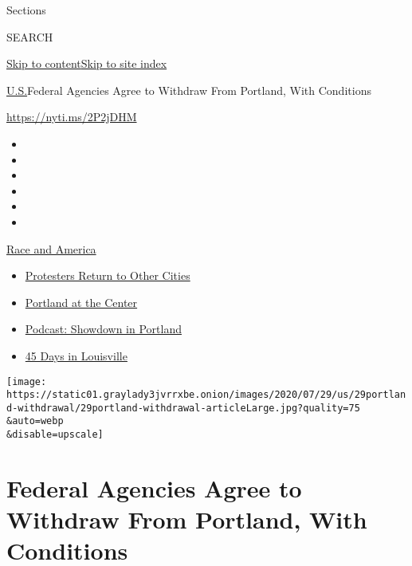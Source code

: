 Sections

SEARCH

\protect\hyperlink{site-content}{Skip to
content}\protect\hyperlink{site-index}{Skip to site index}

\href{/section/us}{U.S.}\textbar{}Federal Agencies Agree to Withdraw
From Portland, With Conditions

\url{https://nyti.ms/2P2jDHM}

\begin{itemize}
\item
\item
\item
\item
\item
\item
\end{itemize}

\href{https://www.nytimes3xbfgragh.onion/news-event/george-floyd-protests-minneapolis-new-york-los-angeles?action=click\&pgtype=Article\&state=default\&region=TOP_BANNER\&context=storylines_menu}{Race
and America}

\begin{itemize}
\tightlist
\item
  \href{https://www.nytimes3xbfgragh.onion/2020/07/26/us/protests-portland-seattle-trump.html?action=click\&pgtype=Article\&state=default\&region=TOP_BANNER\&context=storylines_menu}{Protesters
  Return to Other Cities}
\item
  \href{https://www.nytimes3xbfgragh.onion/2020/07/24/us/portland-oregon-protests-white-race.html?action=click\&pgtype=Article\&state=default\&region=TOP_BANNER\&context=storylines_menu}{Portland
  at the Center}
\item
  \href{https://www.nytimes3xbfgragh.onion/2020/07/23/podcasts/the-daily/portland-protests.html?action=click\&pgtype=Article\&state=default\&region=TOP_BANNER\&context=storylines_menu}{Podcast:
  Showdown in Portland}
\item
  \href{https://www.nytimes3xbfgragh.onion/interactive/2020/07/16/us/black-lives-matter-protests-louisville-breonna-taylor.html?action=click\&pgtype=Article\&state=default\&region=TOP_BANNER\&context=storylines_menu}{45
  Days in Louisville}
\end{itemize}

\texttt{[image: https://static01.graylady3jvrrxbe.onion/images/2020/07/29/us/29portland-withdrawal/29portland-withdrawal-articleLarge.jpg?quality=75\\\&auto=webp\\\&disable=upscale]}

\hypertarget{federal-agencies-agree-to-withdraw-from-portland-with-conditions}{%
\section{Federal Agencies Agree to Withdraw From Portland, With
Conditions}\label{federal-agencies-agree-to-withdraw-from-portland-with-conditions}}

